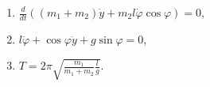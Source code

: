 \begin{enumerate}
	\item $\frac{d}{dt}\left( (m_1 + m_2)\dot{y} +
	m_2l\dot{\varphi}\cos{\varphi}\right) = 0$,
	\item $l\ddot{\varphi} + \cos{\varphi\ddot{y}} + g\sin{\varphi} = 0$,
	\item $T = 2\pi\sqrt{\frac{m_1}{m_1 + m_2}\frac{l}{g}}$.
\end{enumerate}
